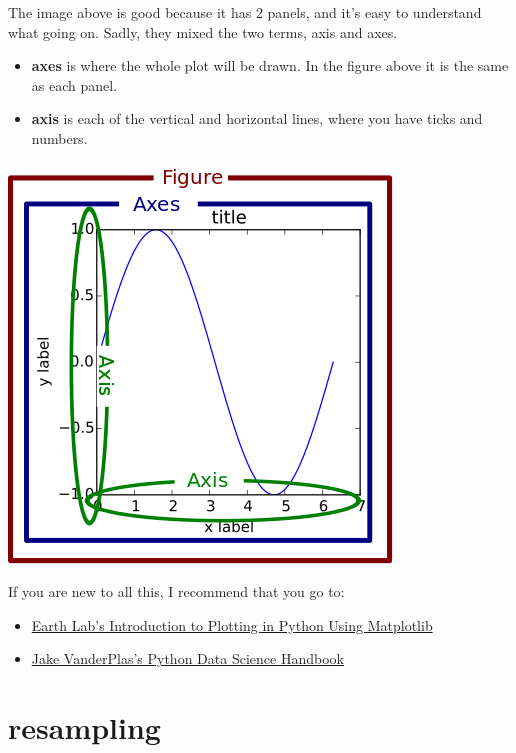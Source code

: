 \documentclass[
  letterpaper,
  DIV=11,
  numbers=noendperiod]{scrreprt}
\providecommand{\tightlist}{%
  \setlength{\itemsep}{0pt}\setlength{\parskip}{0pt}}\usepackage{longtable,booktabs,array}
\begin{document}
The image above is good because it has 2 panels, and it's easy to
understand what going on. Sadly, they mixed the two terms, axis and
axes.

\begin{itemize}
\tightlist
\item
  \textbf{axes} is where the whole plot will be drawn. In the figure
  above it is the same as each panel.
\item
  \textbf{axis} is each of the vertical and horizontal lines, where you
  have ticks and numbers.
\end{itemize}

\includegraphics{basics/axis-vs-axes.png}

If you are new to all this, I recommend that you go to:

\begin{itemize}
\tightlist
\item
  \href{https://www.earthdatascience.org/courses/scientists-guide-to-plotting-data-in-python/plot-with-matplotlib/introduction-to-matplotlib-plots/}{Earth
  Lab's Introduction to Plotting in Python Using Matplotlib}
\item
  \href{https://jakevdp.github.io/PythonDataScienceHandbook/index.html}{Jake
  VanderPlas's Python Data Science Handbook}
\end{itemize}

\part{resampling}
\end{document}
